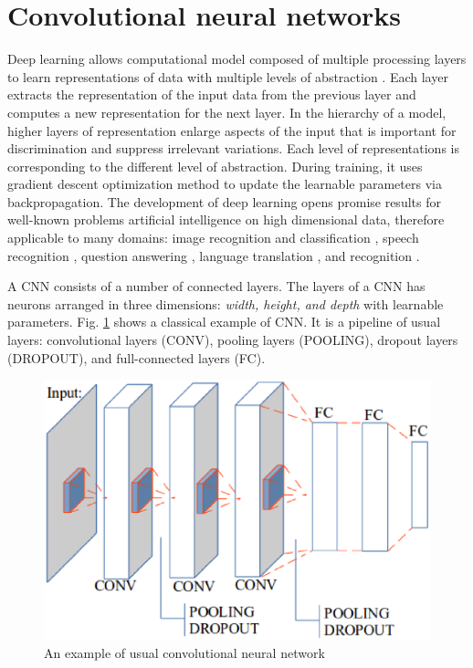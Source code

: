 \documentclass[conference]{IEEEtran}
\begin{document}
\section{Convolutional neural networks}
Deep learning allows computational model composed of multiple processing layers to learn representations of data with multiple levels of abstraction \cite{lecun2015deep}. Each layer extracts the representation of the input data from the previous layer and computes a new representation for the next layer. In the hierarchy of a model, higher layers of representation enlarge aspects of the input that is important for discrimination and suppress irrelevant variations. Each level of representations is corresponding to the different level of abstraction. During training, it uses gradient descent optimization method to update the learnable parameters via backpropagation. The development of deep learning opens promise results for well-known problems artificial intelligence on high dimensional data, therefore applicable to many domains: image recognition and classification \cite{krizhevsky2012imagenet,ciregan2012multi,szegedy2015going}, speech recognition \cite{mikolov2011strategies,hinton2012deep,sainath2013deep}, question answering \cite{bordes2014question}, language translation \cite{sutskever2014sequence} \cite{jean2014using}, and recognition \cite{li2015convolutional}\cite{tompson2014joint}.

A CNN consists of a number of connected layers. The layers of a CNN has neurons arranged in three dimensions: \textit{width, height, and depth} with learnable parameters. Fig. \ref{figconvarc} shows a classical example of CNN. It is a pipeline of usual layers: convolutional layers (CONV), pooling layers (POOLING), dropout layers (DROPOUT), and full-connected layers (FC).
\begin{figure}[htbp]
	\centerline{\includegraphics[scale=0.45]{images/convarc.eps}}
	\caption{An example of usual convolutional neural network}
	\label{figconvarc}
\end{figure}
\end{document}
